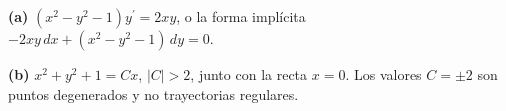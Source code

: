 \noindent\textbf{(a)} $(x^2-y^2-1)y^{\prime}=2xy$, o la forma implícita $-2xy\,dx+(x^2-y^2-1)\,dy=0$.

\noindent\textbf{(b)} $x^2+y^2+1=Cx$, $|C|>2$, junto con la recta $x=0$. Los valores $C=\pm2$ son puntos degenerados y no trayectorias regulares.
